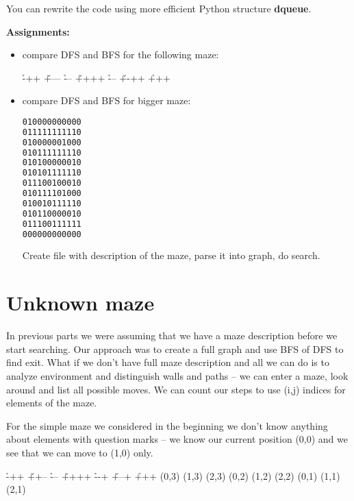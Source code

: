 You can rewrite the code using more efficient Python structure \textbf{dqueue}.

\begin{tcolorbox}
\textbf{Assignments:}
\begin{itemize}
\item compare DFS and BFS for the following maze:
\begin{labyrinth}{3}{4}
        \h -++
\v +--- \h ---
\v ++++ \h ---
\v +-++ \h +++
\end{labyrinth}
\item compare DFS and BFS for bigger maze:

\begin{lstlisting}[language=bash]
010000000000
011111111110
010000001000
010111111110
010100000010
010101111110
011100100010
010111101000
010010111110
010110000010
011100111111
000000000000
\end{lstlisting}

Create file with description of the maze, parse it into graph,
do search.
\end{itemize}
\end{tcolorbox}


\section{Unknown maze}

In previous parts we were assuming that we have a maze
description before we start searching. Our approach
was to create a full graph and use BFS of DFS to
find exit. What if we don't have full maze description and
all we can do is to analyze environment and distinguish
walls and paths -- we can enter a maze, look around
and list all possible moves. We can count our steps
to use (i,j) indices for elements of the maze.

For the simple maze we considered
in the beginning we don't know anything about elements
with question marks -- we know our current position (0,0)
and we see that we can move to (1,0) only.

\begin{labyrinth}{3}{4}
        \h -++
\v ++-- \h ---
\v ++++ \h --+
\v +--+ \h +++
\putsymbol(0,3){}
\putsymbol(1,3){}
\putsymbol(2,3){}
\putsymbol(0,2){}
\putsymbol(1,2){}
\putsymbol(2,2){}
\putsymbol(0,1){}
\putsymbol(1,1){}
\putsymbol(2,1){}
\end{labyrinth}

